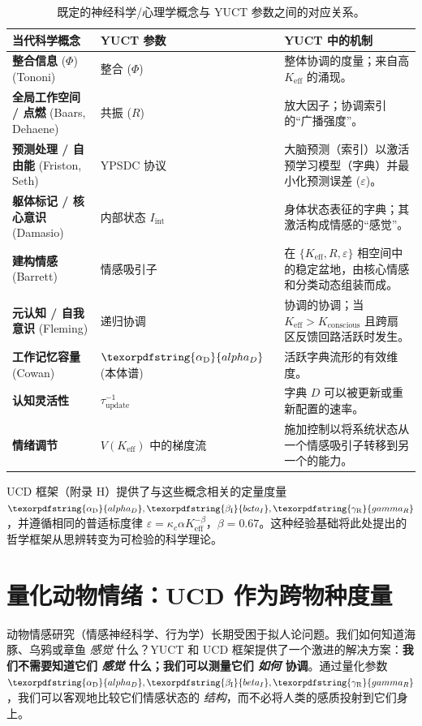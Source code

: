 \documentclass[12pt,a4paper]{article}
\DeclareRobustCommand{\alD}{\texorpdfstring{\ensuremath{\alpha_{\mathrm{D}}}}{alpha_D}}
\DeclareRobustCommand{\beI}{\texorpdfstring{\ensuremath{\beta_{\mathrm{I}}}}{beta_I}}
\DeclareRobustCommand{\gaR}{\texorpdfstring{\ensuremath{\gamma_{\mathrm{R}}}}{gamma_R}}
\newcommand{\eff}{\mathrm{eff}}
\newcommand{\Ke}{K_{\eff}}
\begin{document}
	\begin{table}[H]
		\centering
		\caption{既定的神经科学/心理学概念与 YUCT 参数之间的对应关系。}
		\label{tab:mapping}
		\begin{tabular}{p{4.5cm} p{4cm} p{5cm}}
			\toprule
			\textbf{当代科学概念} & \textbf{YUCT 参数} & \textbf{YUCT 中的机制} \\
			\midrule
			\textbf{整合信息} (\(\Phi\)) (Tononi) & 整合 (\(\Phi\)) & 整体协调的度量；来自高 $K_{\mathrm{eff}}$ 的涌现。 \\
			\textbf{全局工作空间 / 点燃} (Baars, Dehaene) & 共振 (\(R\)) & 放大因子；协调索引的“广播强度”。 \\
			\textbf{预测处理 / 自由能} (Friston, Seth) & YPSDC 协议 & 大脑预测（索引）以激活预学习模型（字典）并最小化预测误差 (\(\varepsilon\))。 \\
			\textbf{躯体标记 / 核心意识} (Damasio) & 内部状态 \(I_{\mathrm{int}}\) & 身体状态表征的字典；其激活构成情感的“感觉”。 \\
			\textbf{建构情感} (Barrett) & 情感吸引子 & 在 $\{K_{\mathrm{eff}}, R, \varepsilon\}$ 相空间中的稳定盆地，由核心情感和分类动态组装而成。 \\
			\textbf{元认知 / 自我意识} (Fleming) & 递归协调 & 协调的协调；当 $K_{\mathrm{eff}} > K_{\mathrm{conscious}}$ 且跨扇区反馈回路活跃时发生。 \\
			\textbf{工作记忆容量} (Cowan) & \(\alD\) (本体谱) & 活跃字典流形的有效维度。 \\
			\textbf{认知灵活性} & \(\tau_{\mathrm{update}}^{-1}\) & 字典 $D$ 可以被更新或重新配置的速率。 \\
			\textbf{情绪调节} & \(V(K_{\mathrm{eff}})\) 中的梯度流 & 施加控制以将系统状态从一个情感吸引子转移到另一个的能力。 \\
			\bottomrule
		\end{tabular}
	\end{table}
	
	UCD 框架（附录 H）提供了与这些概念相关的定量度量 \(\alD, \beI, \gaR\)，并遵循相同的普适标度律 \(\varepsilon = \kappa_c \alpha \Ke^{-\beta}\)，\(\beta = 0.67\)。这种经验基础将此处提出的哲学框架从思辨转变为可检验的科学理论。
	
	\section{量化动物情绪：UCD 作为跨物种度量}
	
	动物情感研究（情感神经科学、行为学）长期受困于拟人论问题。我们如何知道海豚、乌鸦或章鱼 \textit{感觉} 什么？YUCT 和 UCD 框架提供了一个激进的解决方案：\textbf{我们不需要知道它们 \textit{感觉} 什么；我们可以测量它们 \textit{如何} 协调}。通过量化参数 \(\alD, \beI, \gaR\)，我们可以客观地比较它们情感状态的 \textit{结构}，而不必将人类的感质投射到它们身上。
	
\end{document}
